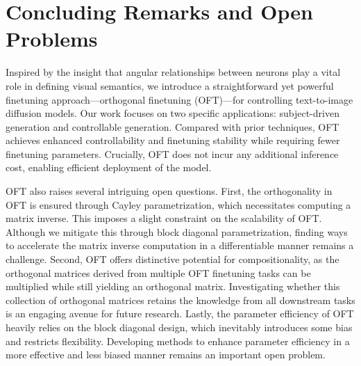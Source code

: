 \section{Concluding Remarks and Open Problems}

Inspired by the insight that angular relationships between neurons play a vital role in defining visual semantics, we introduce a straightforward yet powerful finetuning approach—orthogonal finetuning (OFT)—for controlling text-to-image diffusion models. Our work focuses on two specific applications: subject-driven generation and controllable generation. Compared with prior techniques, OFT achieves enhanced controllability and finetuning stability while requiring fewer finetuning parameters. Crucially, OFT does not incur any additional inference cost, enabling efficient deployment of the model.

OFT also raises several intriguing open questions. First, the orthogonality in OFT is ensured through Cayley parametrization, which necessitates computing a matrix inverse. This imposes a slight constraint on the scalability of OFT. Although we mitigate this through block diagonal parametrization, finding ways to accelerate the matrix inverse computation in a differentiable manner remains a challenge. Second, OFT offers distinctive potential for compositionality, as the orthogonal matrices derived from multiple OFT finetuning tasks can be multiplied while still yielding an orthogonal matrix. Investigating whether this collection of orthogonal matrices retains the knowledge from all downstream tasks is an engaging avenue for future research. Lastly, the parameter efficiency of OFT heavily relies on the block diagonal design, which inevitably introduces some bias and restricts flexibility. Developing methods to enhance parameter efficiency in a more effective and less biased manner remains an important open problem.

